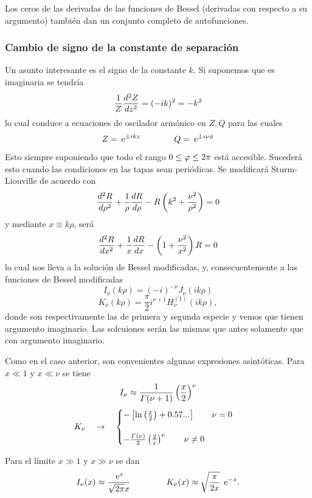 \documentclass[10pt,oneside]{CBFT_book}
\begin{document}
Los ceros de las derivadas de las funciones de Bessel (derivadas con respecto a su argumento) 
también dan un conjunto completo de autofunciones.

\subsubsection{Cambio de signo de la constante de separación}

Un asunto interesante es el signo de la constante $k$. Si suponemos que es imaginaria se
tendría
\[
	\frac{1}{Z} \dtot[2]{Z}{z} = (-ik)^2 = -k^2
\]
lo cual conduce a ecuaciones de oscilador armónico en $Z, Q$ para las cuales
\[
	Z = \euler^{\pm i k z} \qquad \qquad Q = \euler^{\pm i \nu \phi}
\]
Esto siempre suponiendo que todo el rango $0 \leq \vp \leq 2\pi$ está accesible.
Sucederá esto cuando las condiciones en las tapas sean periódicas.
Se modificará Sturm-Liouville de acuerdo con
\[
	\dtot[2]{R}{\rho} + \frac{1}{\rho} \dtot{R}{\rho} - R \left( k^2 + \frac{\nu^2}{\rho^2}\right) = 0 
\]
y mediante $x \equiv k\rho$, será
\[
	\dtot[2]{R}{x} + \frac{1}{x} \dtot{R}{x} - \left( 1 + \frac{\nu^2}{x^2}\right) R = 0 
\]
lo cual nos lleva a la solución de Bessel modificadas, y, consecuentemente 
a las funciones de Bessel modificadas
\[
	I_\nu(k\rho) = (-i)^{-\nu} J_\nu(ik\rho)
\]
\[
	K_\nu(k\rho) = \frac{\pi}{2}i^{\nu+1} H_\nu^{(1)}(ik\rho),
\]
donde son respectivamente las de primera y segunda especie y vemos que tienen 
argumento imaginario.
Las solcuiones serán las mismas que antes solamente que con argumento 
imaginario.



Como en el caso anterior, son convenientes algunas expresiones asintóticas.
Para $ x \ll 1$ y $ x \ll \nu $ se tiene
\[
	I_\nu \approx \frac{1}{\Gamma(\nu+1)} \Frac{x}{2}^\nu 
\]
\[
	K_\nu \quad \to \quad \begin{cases}
			- \left[ \ln\Frac{x}{2} + 0.57... \right] \qquad \nu=0 \\
			\\
			- \frac{\Gamma(\nu)}{2}\Frac{2}{x}^\nu \qquad \nu \neq 0
	             \end{cases}
\]

Para el límite $ x \gg 1 $ y $ x \gg \nu$ se dan
\[
	I_\nu(x) \approx \frac{\euler^{x}}{\sqrt{ 2 \pi } x} \: \qquad \qquad 
	K_\nu(x) \approx \sqrt{ \frac{\pi}{2 x} } \: \euler^{-x}.
\]
\end{document}
